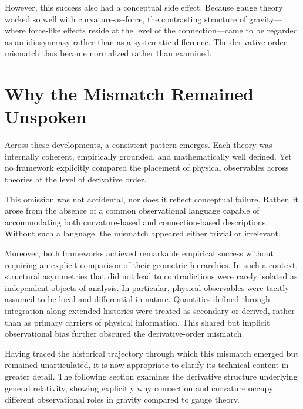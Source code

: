 \documentclass[12pt,letterpaper]{article}
\begin{document}
However, this success also had a conceptual side effect. Because gauge theory worked so well with curvature-as-force, the contrasting structure of gravity---where force-like effects reside at the level of the connection---came to be regarded as an idiosyncrasy rather than as a systematic difference. The derivative-order mismatch thus became normalized rather than examined.

\section{Why the Mismatch Remained Unspoken}

\justifying
Across these developments, a consistent pattern emerges. Each theory was internally coherent, empirically grounded, and mathematically well defined. Yet no framework explicitly compared the placement of physical observables across theories at the level of derivative order.

This omission was not accidental, nor does it reflect conceptual failure. Rather, it arose from the absence of a common observational language capable of accommodating both curvature-based and connection-based descriptions. Without such a language, the mismatch appeared either trivial or irrelevant.

Moreover, both frameworks achieved remarkable empirical success without requiring an explicit comparison of their geometric hierarchies. In such a context, structural asymmetries that did not lead to contradictions were rarely isolated as independent objects of analysis.
In particular, physical observables were tacitly assumed to be local and differential in nature. Quantities defined through integration along extended histories were treated as secondary or derived, rather than as primary carriers of physical information. This shared but implicit observational bias further obscured the derivative-order mismatch.

Having traced the historical trajectory through which this mismatch emerged but remained unarticulated, it is now appropriate to clarify its technical content in greater detail. The following section examines the derivative structure underlying general relativity, showing explicitly why connection and curvature occupy different observational roles in gravity compared to gauge theory.

\end{document}
